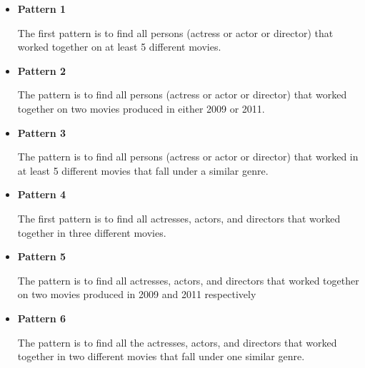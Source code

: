 \begin{itemize}

\item \textbf{Pattern 1}

The first pattern is to find all persons (actress or actor or director) that worked together on at least 5 different movies.

\item \textbf{Pattern 2}

The pattern is to find all persons (actress or actor or director) that worked together on two movies produced in either 2009 or 2011.

\item \textbf{Pattern 3}

The pattern is to find all persons (actress or actor or director) that worked in at least 5 different movies that fall under a similar genre.

\item \textbf{Pattern 4}

The first pattern is to find all actresses, actors, and directors that worked together in three different movies.

\item \textbf{Pattern 5}

The pattern is to find all actresses, actors, and directors that worked together on two movies produced in 2009 and 2011 respectively

\item \textbf{Pattern 6}

The pattern is to find all the actresses, actors, and directors that worked together in two different movies that fall under one similar genre.

\end{itemize}
